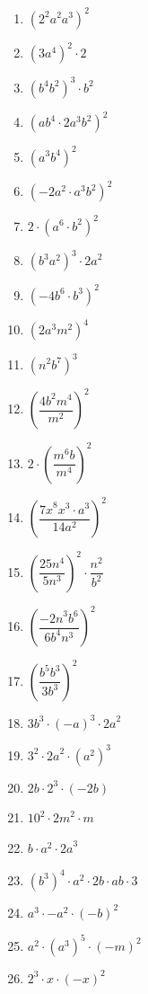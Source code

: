 \begin{exercise}
\begin{enumerate}[cols=3]
  \item \(\left( 2^{2}a^{2}a^{3} \right)^{2} \)
  \item \(\left( 3a^{4} \right)^{2} \cdot 2 \)
  \item \(\left( b^{4}b^{2} \right)^{3} \cdot b^{2} \)
  \item \(\left( {ab}^{4} \cdot 2a^{3}b^{2} \right)^{2} \)
  \item \(\left( a^{3}b^{4} \right)^{2} \)
  \item \(\left( - 2a^{2} \cdot a^{3}b^{2} \right)^{2} \)
  \item \({2 \cdot \left( a^{6} \cdot b^{2} \right)}^{2} \)
  \item \(\left( b^{3}a^{2} \right)^{3} \cdot {2a}^{2} \)
  \item \(\left( - 4b^{6} \cdot b^{3} \right)^{2} \)
  \item \(\left( 2a^{3}m^{2} \right)^{4} \)
  \item \(\left( n^{2}b^{7} \right)^{3} \)
  \item \(\left( \dfrac{{4b}^{2}m^{4}}{m^{2}} \right)^{2} \)
  \item \(2 \cdot \left( \dfrac{m^{6}b}{m^{4}} \right)^{2} \)
  \item \(\left( \dfrac{{7x}^{8}x^{3} \cdot a^{3}}{14a^{2}} \right)^{2} \)
  \item \(\left( \dfrac{25n^{4}}{5n^{3}} \right)^{2} \cdot \dfrac{n^{2}}{b^{2}} \)
  \item \(\left( \dfrac{{- 2n}^{3}b^{6}}{6b^{4}n^{3}} \right)^{2} \)
  \item \(\left( \dfrac{b^{5}b^{3}}{3b^{3}} \right)^{2} \)
  \item \({3b}^{3} \cdot ( - a)^{3} \cdot {2a}^{2} \)
  \item \(3^{2} \cdot {2a}^{2} \cdot \left( a^{2} \right)^{3} \)
  \item \(2b \cdot 2^{3} \cdot ( - 2b) \)
  \item \(10^{2} \cdot {2m}^{2} \cdot m \)
  \item \(b \cdot a^{2} \cdot {2a}^{3} \)
  \item \(\left( b^{3} \right)^{4} \cdot a^{2} \cdot 2b \cdot ab \cdot 3 \)
  \item \(a^{3} \cdot {- a}^{2} \cdot ( - b)^{2} \)
  \item \(a^{2} \cdot \left( a^{3} \right)^{5} \cdot ( - m)^{2} \)
  \item \(2^{3} \cdot x \cdot ( - x)^{2} \)
    
  \end{enumerate}
  
\end{exercise}


